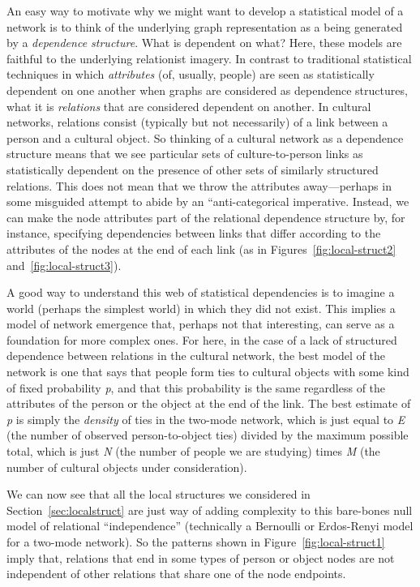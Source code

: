 \documentclass[preprint,12pt,authoryear]{elsarticle}
\begin{document}
An easy way to motivate why we might want to develop a statistical model of a network is to think of the underlying graph representation as a being generated by a \textit{dependence structure}. What is dependent on what? Here, these models are faithful to the underlying relationist imagery. In contrast to traditional statistical techniques in which \textit{attributes} (of, usually, people) are seen as statistically dependent on one another when graphs are considered as dependence structures, what it is \textit{relations} that are considered dependent on another. In cultural networks, relations consist (typically but not necessarily) of a link between a person and a cultural object. So thinking of a cultural network as a dependence structure means that we see particular sets of culture-to-person links as statistically dependent on the presence of other sets of similarly structured relations. This does not mean that we throw the attributes away---perhaps in some misguided attempt to abide by an ``anti-categorical imperative. Instead, we can make the node attributes part of the relational dependence structure by, for instance, specifying dependencies between links that differ according to the attributes of the nodes at the end of each link (as in Figures~\ref{fig:local-struct2} and~\ref{fig:local-struct3}). 

A good way to understand this web of statistical dependencies is to imagine a world (perhaps the simplest world) in which they did not exist. This implies a model of network emergence that, perhaps not that interesting, can serve as a foundation for more complex ones. For here, in the case of a lack of structured dependence between relations in the cultural network, the best model of the network is one that says that people form ties to cultural objects with some kind of fixed probability \textit{p}, and that this probability is the same regardless of the attributes of the person or the object at the end of the link. The best estimate of \textit{p} is simply the \textit{density} of ties in the two-mode network, which is just equal to \textit{E} (the number of observed person-to-object ties) divided by the maximum possible total, which is just \textit{N} (the number of people we are studying) times \textit{M} (the number of cultural objects under consideration).

We can now see that all the local structures we considered in Section~\ref{sec:localstruct} are just way of adding complexity to this bare-bones null model of relational ``independence'' (technically a Bernoulli or Erdos-Renyi model for a two-mode network). So the patterns shown in Figure~\ref{fig:local-struct1} imply that, relations that end in some types of person or object nodes are not independent of other relations that share one of the node endpoints. 
\end{document}
